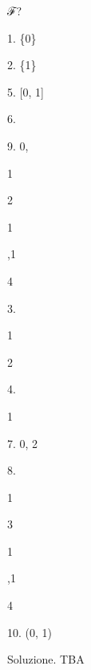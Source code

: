 \documentclass[a4paper,portrait,12pt]{article}
\begin{document}
\begin{flushleft}
ℱ?
\end{flushleft}


1. \{0\}





2. \{1\}





5. [0, 1]





6.





9. 0,





1


2





1


,1


4





3.





1


2





4.


1





7. 0, 2





8.





1


3


1


,1


4





10. (0, 1)





\begin{flushleft}
Soluzione. TBA
\end{flushleft}
\end{document}
